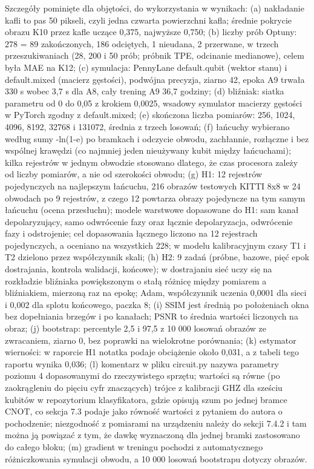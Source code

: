 {Szczegóły pominięte dla objętości, do wykorzystania w wynikach: (a) nakładanie kafli to pas 50 pikseli, czyli jedna czwarta powierzchni kafla; średnie pokrycie obrazu K10 przez kafle uczące 0,375, najwyższe 0,750; (b) liczby prób Optuny: 278 = 89 zakończonych, 186 odciętych, 1 nieudana, 2 przerwane, w trzech przeszukiwaniach (28, 200 i 50 prób; próbnik TPE, odcinanie medianowe), celem była MAE na K12; (c) symulacja: PennyLane default.qubit (wektor stanu) i default.mixed (macierz gęstości), podwójna precyzja, ziarno 42, epoka A9 trwała 330 s wobec 3,7 s dla A8, cały trening A9 36,7 godziny; (d) bliźniak: siatka parametru od 0 do 0,05 z krokiem 0,0025, wsadowy symulator macierzy gęstości w PyTorch zgodny z default.mixed; (e) skończona liczba pomiarów: 256, 1024, 4096, 8192, 32768 i 131072, średnia z trzech losowań; (f) łańcuchy wybierano według sumy -ln(1-e) po bramkach i odczycie obwodu, zachłannie, rozłączne i bez wspólnej krawędzi (co najmniej jeden nieużywany kubit między łańcuchami); kilka rejestrów w jednym obwodzie stosowano dlatego, że czas procesora zależy od liczby pomiarów, a nie od szerokości obwodu; (g) H1: 12 rejestrów pojedynczych na najlepszym łańcuchu, 216 obrazów testowych KITTI 8x8 w 24 obwodach po 9 rejestrów, z czego 12 powtarza obrazy pojedyncze na tym samym łańcuchu (ocena przesłuchu); modele warstwowe dopasowane do H1: sam kanał depolaryzujący, samo odwrócenie fazy oraz łącznie depolaryzacja, odwrócenie fazy i odstrojenie; cel dopasowania łącznego liczono na 12 rejestrach pojedynczych, a oceniano na wszystkich 228; w modelu kalibracyjnym czasy T1 i T2 dzielono przez współczynnik skali; (h) H2: 9 zadań (próbne, bazowe, pięć epok dostrajania, kontrola walidacji, końcowe); w dostrajaniu sieć uczy się na rozkładzie bliźniaka powiększonym o stałą różnicę między pomiarem a bliźniakiem, mierzoną raz na epokę; Adam, współczynnik uczenia 0,0001 dla sieci i 0,002 dla splotu końcowego, paczka 8; (i) SSIM jest średnią po położeniach okna bez dopełniania brzegów i po kanałach; PSNR to średnia wartości liczonych na obraz; (j) bootstrap: percentyle 2,5 i 97,5 z 10 000 losowań obrazów ze zwracaniem, ziarno 0, bez poprawki na wielokrotne porównania; (k) estymator wierności: w raporcie H1 notatka podaje obciążenie około 0,031, a z tabeli tego raportu wynika 0,036; (l) komentarz w pliku circuit.py nazywa parametry poziomu 4 dopasowanymi do rzeczywistego sprzętu; wartości są równe (po zaokrągleniu do pięciu cyfr znaczących) trójce z kalibracji GHZ dla sześciu kubitów w repozytorium klasyfikatora, gdzie opisują szum po jednej bramce CNOT, co sekcja 7.3 podaje jako równość wartości z pytaniem do autora o pochodzenie; niezgodność z pomiarami na urządzeniu należy do sekcji 7.4.2 i tam można ją powiązać z tym, że dawkę wyznaczoną dla jednej bramki zastosowano do całego bloku; (m) gradient w treningu pochodzi z automatycznego różniczkowania symulacji obwodu, a 10 000 losowań bootstrapu dotyczy obrazów.
}

